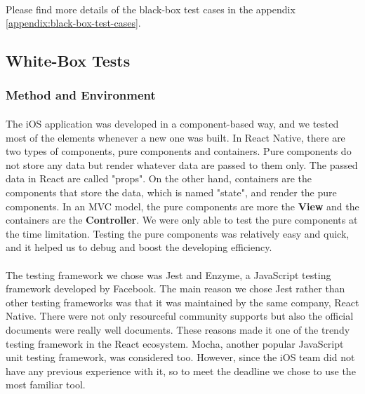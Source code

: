 \documentclass[12pt,a4paper]{article}
\begin{document}
          \paragraph{} Please find more details of the black-box test cases in the appendix \ref{appendix:black-box-test-cases}.

      \subsection{White-Box Tests}
        \subsubsection{Method and Environment} %
          \paragraph{}The iOS application was developed in a component-based way, and we tested most of the elements whenever a new one was built. In React Native, there are two types of components, pure components and containers. Pure components do not store any data but render whatever data are passed to them only. The passed data in React are called "props". On the other hand, containers are the components that store the data, which is named "state", and render the pure components. In an MVC model, the pure components are more the {\bf View} and the containers are the {\bf Controller}. We were only able to test the pure components at the time limitation. Testing the pure components was relatively easy and quick, and it helped us to debug and boost the developing efficiency.
          
          \paragraph{}The testing framework we chose was Jest\cite{Jest} and Enzyme\cite{Enzyme}, a JavaScript testing framework developed by Facebook. The main reason we chose Jest rather than other testing frameworks was that it was maintained by the same company, React Native. There were not only resourceful community supports but also the official documents were really well documents. These reasons made it one of the trendy testing framework in the React ecosystem. Mocha, another popular JavaScript unit testing framework, was considered too. However, since the iOS team did not have any previous experience with it, so to meet the deadline we chose to use the most familiar tool.
        
\end{document}
